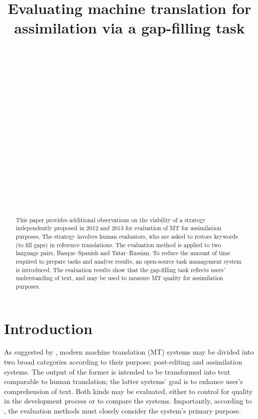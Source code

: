 \documentclass[11pt]{article}
\title{Evaluating machine translation for assimilation via a gap-filling task}
\author{\blankout{Ekaterina Ageeva}\\
  \blankout{School of Linguistics}\\
  \blankout{Higher School of Economics}\\
  \blankout{Moscow, Russia}\\
  \blankout{{\tt evageeva\_2@edu.hse.ru}}\\[2ex]
  \blankout{\textbf{Francis M. Tyers}}\\
  \blankout{HSL-fakultetet}\\ 
  \blankout{UiT Norgga \'{a}rktala\v{s} universitehta} \\
  \blankout{9017 Romsa, Norway} \\
  \blankout{{\tt francis.tyers@uit.no}}
  \And
  \blankout{Mikel L. Forcada}\\
  \blankout{Dept. Llenguatges i Sistemes Inform\`{a}tics}\\
  \blankout{Universitat d'Alacant, Spain} \\
  \blankout{{\tt mlf@dlsi.ua.es}}  \\[2ex]
  \blankout{\textbf{Juan Antonio P\'{e}rez-Ortiz}} \\
  \blankout{Dept. Llenguatges i Sistemes Inform\`{a}tics}\\
  \blankout{Universitat d'Alacant, Spain} \\
  \blankout{{\tt japerez@dlsi.ua.es}}
}
\date{}
\begin{document}
\maketitle
\renewcommand{\baselinestretch}{0.97} %
\begin{abstract}
  This paper provides additional observations on the viability of a
  strategy independently proposed in 2012 and 2013 for evaluation of
 MT for assimilation purposes. The strategy involves
  human evaluators, who are asked to restore keywords (to fill gaps) in
  reference translations. The evaluation method is applied to two language pairs, Basque--Spanish and Tatar--Russian. To reduce the amount of time required to prepare tasks
  and analyse results, an open-source task management system is
  introduced. The evaluation results show that the gap-filling task
  reflects users' understanding of text, and may be used to measure MT
  quality for assimilation purposes.
\end{abstract}

\section{Introduction}

As suggested by \citet{church93}, modern machine translation (MT) systems may
be divided into two broad categories according to their purpose: post-editing and assimilation systems. The output of the former is intended to be transformed into text comparable to human translation; the latter systems' goal is to enhance user's comprehension of text. Both kinds may be evaluated, either to control for quality in the development process or to compare the systems. Importantly, according to \citet{church93}, the evaluation methods must closely consider the system's primary purpose.
\end{document}
